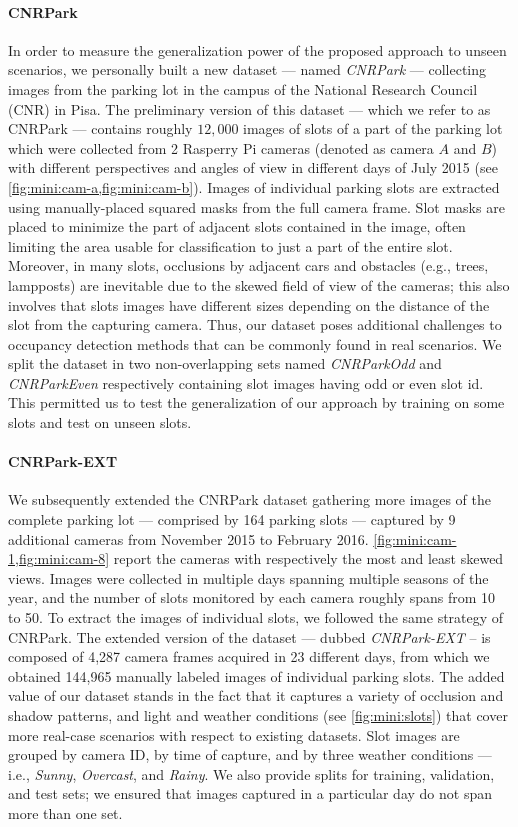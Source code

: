 \paragraph{CNRPark}
In order to measure the generalization power of the proposed approach to unseen scenarios, we personally built a new dataset --- named \emph{CNRPark} --- collecting images from the parking lot in the campus of the National Research Council (CNR) in Pisa.
The preliminary version of this dataset --- which we refer to as CNRPark --- contains roughly $12,000$ images of slots of a part of the parking lot which were collected from 2 Rasperry Pi cameras (denoted as camera $A$ and $B$) with different perspectives and angles of view in different days of July 2015 (see \ref{fig:mini:cam-a,fig:mini:cam-b}).
Images of individual parking slots are extracted using manually-placed squared masks from the full camera frame.
Slot masks are placed to minimize the part of adjacent slots contained in the image, often limiting the area usable for classification to just a part of the entire slot.
Moreover, in many slots, occlusions by adjacent cars and obstacles (e.g., trees, lampposts) are inevitable due to the skewed field of view of the cameras;
this also involves that slots images have different sizes depending on the distance of the slot from the capturing camera.
Thus, our dataset poses additional challenges to occupancy detection methods that can be commonly found in real scenarios.
We split the dataset in two non-overlapping sets named \emph{CNRParkOdd} and \emph{CNRParkEven} respectively containing slot images having odd or even slot id.
This permitted us to test the generalization of our approach by training on some slots and test on unseen slots.

\paragraph{CNRPark-EXT}
We subsequently extended the CNRPark dataset gathering more images of the complete parking lot --- comprised by 164 parking slots --- captured by 9 additional cameras from November 2015 to February 2016.
\ref{fig:mini:cam-1,fig:mini:cam-8} report the cameras with respectively the most and least skewed views.
Images were collected in multiple days spanning multiple seasons of the year, and the number of slots monitored by each camera roughly spans from 10 to 50.
To extract the images of individual slots, we followed the same strategy of CNRPark.
The extended version of the dataset --- dubbed \emph{CNRPark-EXT} -- is composed of 4,287 camera frames acquired in 23 different days, from which we obtained 144,965 manually labeled images of individual parking slots.
The added value of our dataset stands in the fact that it captures a variety of occlusion and shadow patterns, and light and weather conditions (see \ref{fig:mini:slots}) that cover more real-case scenarios with respect to existing datasets.
Slot images are grouped by camera ID, by time of capture, and by three weather conditions --- i.e., \emph{Sunny}, \emph{Overcast}, and \emph{Rainy}.
We also provide splits for training, validation, and test sets;
we ensured that images captured in a particular day do not span more than one set.

